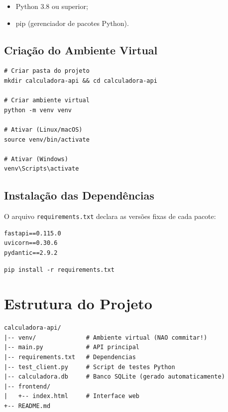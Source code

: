 \documentclass[12pt, a4paper]{article}
\begin{document}
\begin{itemize}[leftmargin=*]
  \item Python 3.8 ou superior;
  \item pip (gerenciador de pacotes Python).
\end{itemize}

\subsection{Criação do Ambiente Virtual}

\begin{lstlisting}[style=bash, caption={Criação e ativação do ambiente virtual}]
# Criar pasta do projeto
mkdir calculadora-api && cd calculadora-api

# Criar ambiente virtual
python -m venv venv

# Ativar (Linux/macOS)
source venv/bin/activate

# Ativar (Windows)
venv\Scripts\activate
\end{lstlisting}

\subsection{Instalação das Dependências}

O arquivo \texttt{requirements.txt} declara as versões fixas de cada pacote:

\begin{lstlisting}[style=bash]
fastapi==0.115.0
uvicorn==0.30.6
pydantic==2.9.2
\end{lstlisting}

\begin{lstlisting}[style=bash]
pip install -r requirements.txt
\end{lstlisting}

\section{Estrutura do Projeto}

\begin{lstlisting}[style=bash, caption={Estrutura de arquivos do projeto}]
calculadora-api/
|-- venv/              # Ambiente virtual (NAO commitar!)
|-- main.py            # API principal
|-- requirements.txt   # Dependencias
|-- test_client.py     # Script de testes Python
|-- calculadora.db     # Banco SQLite (gerado automaticamente)
|-- frontend/
|   +-- index.html     # Interface web
+-- README.md
\end{lstlisting}
\end{document}
